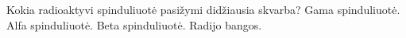 Kokia radioaktyvi spinduliuotė pasižymi didžiausia skvarba?
Gama spinduliuotė.
Alfa spinduliuotė.
Beta spinduliuotė.
Radijo bangos.